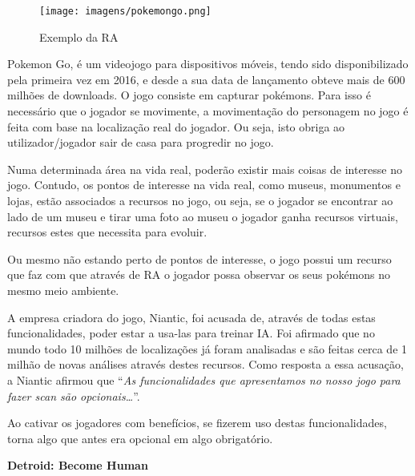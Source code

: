 \documentclass{report}
\begin{document}
\vspace{20pt}

\begin{wrapfigure}{r}{0.4\textwidth} 
    \centering
    \texttt{[image: imagens/pokemongo.png]}
    \footnotesize{\caption{Exemplo da RA}}
    \label{poke}
\end{wrapfigure}

Pokemon Go, é um videojogo para dispositivos móveis, tendo sido disponibilizado pela primeira vez em 2016, e desde a sua data de lançamento obteve mais de 600 milhões de downloads.
O jogo consiste em capturar pokémons. Para isso é necessário que o jogador se movimente, a movimentação do personagem no jogo é feita com base na localização real do jogador. 
 Ou seja, isto obriga ao utilizador/jogador sair de casa para progredir no jogo. 
 
\vspace{5pt}

Numa determinada área na vida real, poderão existir mais coisas de interesse no jogo.
Contudo, os pontos de interesse na vida real, como museus, monumentos e lojas, estão associados a recursos no jogo, ou seja, se o jogador se encontrar ao lado de um museu e tirar uma foto ao museu o jogador ganha recursos virtuais, recursos estes que necessita para evoluir.

\vspace{5pt}

Ou mesmo não estando perto de pontos de interesse, o jogo possui um recurso que faz com que através de \ac{RA} o jogador possa observar os seus pokémons no mesmo meio ambiente.

\vspace{5pt}

A empresa criadora do jogo, Niantic, foi acusada de, através de todas estas funcionalidades, poder estar a usa-las para treinar \ac{IA}. Foi afirmado que no mundo todo 10 milhões de localizações já foram analisadas e são feitas cerca de 1 milhão de novas análises através destes recursos.
Como resposta a essa acusação, a Niantic afirmou que “\textit{As funcionalidades que apresentamos no nosso jogo para fazer scan são opcionais…}”. 

Ao cativar os jogadores com benefícios, se fizerem uso destas funcionalidades, torna algo que antes era opcional em algo obrigatório.

\clearpage

\begin{center}
    \Huge{\textbf{Detroid: Become Human}}   
\end{center}
\vspace{50pt}
\end{document}
